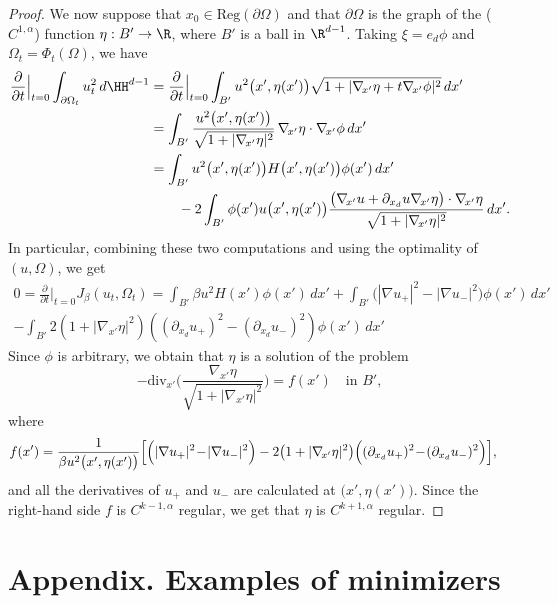 \begin{proof}
We now suppose that $x_0\in \text{Reg}(\partial\Omega)$ and that $\partial \Omega$ is the graph of the ($C^{1,\alpha}$) function $\eta:B'\to\R$, where $B'$ is a ball in $\R^{d-1}$.
Taking $\xi=e_d\phi$ and $\Omega_t=\Phi_t(\Omega)$, we have
\begin{align*}
\frac{\partial}{\partial t}\Big\vert_{t=0}\int_{\partial\Omega_t}u_t^2\,d\HH^{d-1}&=\frac{\partial}{\partial t}\Big\vert_{t=0}\int_{B'}u^2\big(x',\eta(x')\big)\sqrt{1+|\nabla_{\!x'}\eta+t\nabla_{\!x'}\phi|^2}\,dx'\\
&=\int_{B'}\frac{u^2\big(x',\eta(x')\big)}{\sqrt{1+|\nabla_{\!x'}\eta|^2}}\,\nabla_{\!x'}\eta\cdot\nabla_{\!x'}\phi\,dx'\\
&=\int_{B'}u^2\big(x',\eta(x')\big)H\big(x',\eta(x')\big)\phi(x')\,dx'\\
&\qquad -2\int_{B'}\phi(x')u\big(x',\eta(x')\big)\frac{\big(\nabla_{\!x'}u+\partial_{x_d}u\nabla_{\!x'}\eta\big)\cdot\nabla_{\!x'}\eta}{\sqrt{1+|\nabla_{\!x'}\eta|^2}}\,dx'.
\end{align*}
In particular, combining these two computations and using the optimality of $(u,\Omega)$, we get
\begin{multline*}
0=\frac{\partial}{\partial t}\Big\vert_{t=0}J_\beta(u_t,\Omega_t)=\int_{B'}\beta u^2 H(x')\phi(x')\,dx'+\int_{B'}\big(|\nabla u_+|^2-|\nabla u_-|^2\big)\phi(x')\,dx'\\
-\int_{B'}2\left(1+|\nabla_{\!x'}\eta|^2\right)\left((\partial_{x_d} u_+)^2-(\partial_{x_d}u_-)^2\right)\phi(x')\,dx'
\end{multline*}
Since $\phi$ is arbitrary, we obtain that $\eta$ is a solution of the problem
\[-\text{div}_{x'}\biggl(\frac{\nabla_{\!x'}\eta}{\sqrt{1+|\nabla_{\!x'}\eta|^2}}\biggr)=f(x')\quad\text{in } B',\]
where
\begin{align*}
f(x')&=\frac1{\beta u^2\big(x',\eta(x')\big)}\Bigl[\Bigl(|\nabla u_+|^2\!-\!|\nabla u_-|^2\Bigr)-2\big(1+|\nabla_{\!x'}\eta|^2\big)\Bigl((\partial_{x_d} u_+)^2\!-\!(\partial_{x_d}u_-)^2\Bigr)\Bigr],
\end{align*}
and all the derivatives of $u_+$ and $u_-$ are calculated at $\big(x',\eta(x')\big)$. Since the right-hand side $f$ is $C^{k-1,\alpha}$ regular, we get that $\eta$ is $C^{k+1,\alpha}$ regular.
\end{proof}

\appendix

\section*{Appendix. Examples of minimizers}

